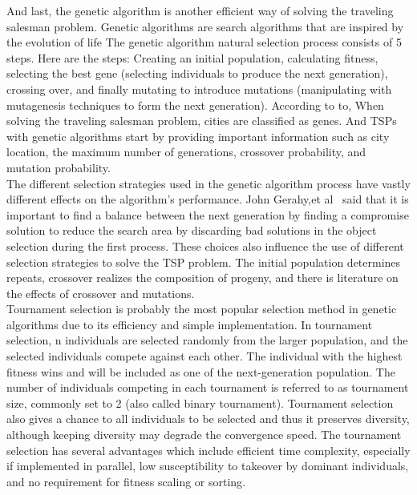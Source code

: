 \documentclass[12pt]{article}
\begin{document}
And last, the genetic algorithm is another efficient way of solving the traveling salesman problem. Genetic algorithms are search algorithms that are inspired by the evolution of life
The genetic algorithm natural selection process consists of 5 steps. Here are the steps: Creating an initial population, calculating fitness, selecting the best gene (selecting individuals to produce the next generation), crossing over, and finally mutating to introduce mutations (manipulating with mutagenesis techniques to form the next generation). According to to\cite{braun1990solving}, When solving the traveling salesman problem, cities are classified as genes. And TSPs with genetic algorithms start by providing important information such as city location, the maximum number of generations, crossover probability, and mutation probability.\\

The different selection strategies used in the genetic algorithm process have vastly different effects on the algorithm’s performance. John Gerahy,et al~\cite{moschovakis2001algorithm} said that it is important to find a balance between the next generation by finding a compromise solution to reduce the search area by discarding bad solutions in the object selection during the first process. These choices also influence the use of different selection strategies to solve the TSP problem. The initial population determines repeats, crossover realizes the composition of progeny, and there is literature\cite{deng2015improved} on the effects of crossover and mutations. \\

Tournament selection is probably the most popular selection method in genetic algorithms due to its efficiency and simple implementation\cite{goldberg1991comparative}. In tournament selection, n individuals are selected randomly from the larger population, and the selected individuals compete against each other. The individual with the highest fitness wins and will be included as one of the next-generation population. The number of individuals competing in each tournament is referred to as tournament size, commonly set to 2 (also called binary tournament). Tournament selection also gives a chance to all individuals to be selected and thus it preserves diversity, although keeping diversity may degrade the convergence speed. The tournament selection has several advantages which include efficient time complexity, especially if implemented in parallel, low susceptibility to takeover by dominant individuals, and no requirement for fitness scaling or sorting\cite{goldberg1991comparative}\cite{zitzler1998evolutionary}. \\
\end{document}
